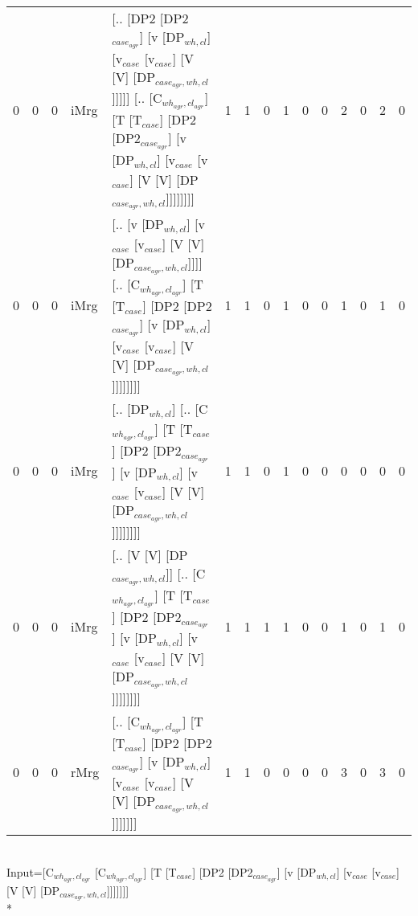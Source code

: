 \begin{tabularx}{\linewidth}{rrrlXrrrrrrrrrr}
   0 &       0 &   0 & iMrg & [.. [DP2 [DP2$_{case_{agr}}$] [v [DP$_{wh,cl}$] [v$_{case}$ [v$_{case}$] [V [V] [DP$_{case_{agr},wh,cl}$]]]]] [.. [C$_{wh_{agr},cl_{agr}}$] [T [T$_{case}$] [DP2 [DP2$_{case_{agr}}$] [v [DP$_{wh,cl}$] [v$_{case}$ [v$_{case}$] [V [V] [DP$_{case_{agr},wh,cl}$]]]]]]]]              &             1 &             1 &                  0 &            1 &              0 &              0 &        2 &             0 &        2 &             0 \\
   0 &       0 &   0 & iMrg & [.. [v [DP$_{wh,cl}$] [v$_{case}$ [v$_{case}$] [V [V] [DP$_{case_{agr},wh,cl}$]]]] [.. [C$_{wh_{agr},cl_{agr}}$] [T [T$_{case}$] [DP2 [DP2$_{case_{agr}}$] [v [DP$_{wh,cl}$] [v$_{case}$ [v$_{case}$] [V [V] [DP$_{case_{agr},wh,cl}$]]]]]]]]                                   &             1 &             1 &                  0 &            1 &              0 &              0 &        1 &             0 &        1 &             0 \\
   0 &       0 &   0 & iMrg & [.. [DP$_{wh,cl}$] [.. [C$_{wh_{agr},cl_{agr}}$] [T [T$_{case}$] [DP2 [DP2$_{case_{agr}}$] [v [DP$_{wh,cl}$] [v$_{case}$ [v$_{case}$] [V [V] [DP$_{case_{agr},wh,cl}$]]]]]]]]                                                                                     &             1 &             1 &                  0 &            1 &              0 &              0 &        0 &             0 &        0 &             0 \\
   0 &       0 &   0 & iMrg & [.. [V [V] [DP$_{case_{agr},wh,cl}$]] [.. [C$_{wh_{agr},cl_{agr}}$] [T [T$_{case}$] [DP2 [DP2$_{case_{agr}}$] [v [DP$_{wh,cl}$] [v$_{case}$ [v$_{case}$] [V [V] [DP$_{case_{agr},wh,cl}$]]]]]]]]                                                                    &             1 &             1 &                  1 &            1 &              0 &              0 &        1 &             0 &        1 &             0 \\
   0 &       0 &   0 & rMrg & [.. [C$_{wh_{agr},cl_{agr}}$] [T [T$_{case}$] [DP2 [DP2$_{case_{agr}}$] [v [DP$_{wh,cl}$] [v$_{case}$ [v$_{case}$] [V [V] [DP$_{case_{agr},wh,cl}$]]]]]]]                                                                                                     &             1 &             1 &                  0 &            0 &              0 &              0 &        3 &             0 &        3 &             0 \\
\hline
\end{tabularx}\endgroup\\
\begingroup\scriptsize Input=[C$_{wh_{agr},cl_{agr}}$ [C$_{wh_{agr},cl_{agr}}$] [T [T$_{case}$] [DP2 [DP2$_{case_{agr}}$] [v [DP$_{wh,cl}$] [v$_{case}$ [v$_{case}$] [V [V] [DP$_{case_{agr},wh,cl}$]]]]]]]\\*
